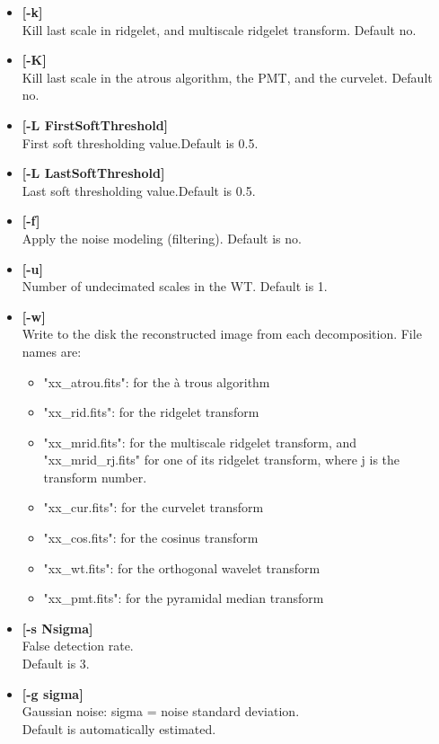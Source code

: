 \documentclass[11pt,a4paper]{article}
\begin{document}
\begin{itemize}
\item {\bf [-k]} \\
Kill last scale in ridgelet, and multiscale ridgelet transform.
Default no.

\item {\bf  [-K]} \\
Kill last scale in the atrous algorithm, the PMT, and the curvelet.
Default no.

\item {\bf  [-L FirstSoftThreshold]} \\
First soft thresholding value.Default is 0.5.

\item {\bf  [-L LastSoftThreshold]} \\
Last soft thresholding value.Default is 0.5.

\item {\bf  [-f]} \\
Apply the noise modeling (filtering). Default is no. 

\item {\bf  [-u]} \\
 Number of undecimated scales in the WT.
 Default is 1. 

\item {\bf [-w] } \\
 Write to the disk the reconstructed image
 from each decomposition. File names are:
\begin{itemize}
\item "xx\_atrou.fits": for the \`a trous algorithm
\item "xx\_rid.fits": for the ridgelet transform
\item "xx\_mrid.fits": for the multiscale ridgelet transform, and
"xx\_mrid\_rj.fits" for one of its ridgelet transform, where j is the
transform number.
\item "xx\_cur.fits": for the curvelet transform
\item "xx\_cos.fits": for the cosinus transform
\item "xx\_wt.fits": for the orthogonal wavelet transform
\item "xx\_pmt.fits": for the pyramidal median transform
\end{itemize}

\item {\bf [-s Nsigma]} \\
False detection rate. \\
Default is 3.

\item {\bf [-g sigma]} \\
Gaussian noise: sigma = noise standard deviation.  \\
 Default is automatically estimated.


\end{itemize}
\end{document}

